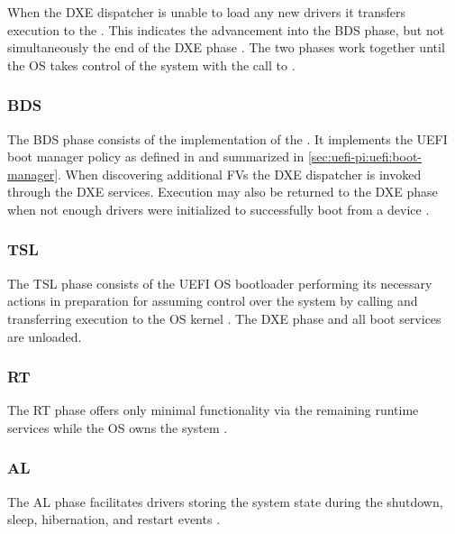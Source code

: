 When the \ac{DXE} dispatcher is unable to load any new drivers it transfers execution to the  \cite[Vol. 2, 2.4]{pi-spec}.
This indicates the advancement into the \ac{BDS} phase, but not simultaneously the end of the \ac{DXE} phase \cite[Vol. 2, 2.1]{pi-spec}.
The two phases work together until the \ac{OS} takes control of the system with the call to .

\subsubsection{\acf{BDS}}

The \ac{BDS} phase consists of the implementation of the .
It implements the \ac{UEFI} boot manager policy as defined in \cite[Section 3]{uefi-spec} and summarized in \autoref{sec:uefi-pi:uefi:boot-manager}.
When discovering additional \acp{FV} the \ac{DXE} dispatcher is invoked through the \ac{DXE} services.
Execution may also be returned to the \ac{DXE} phase when not enough drivers were initialized to successfully boot from a device \cite[Vol. 2, 12.2]{pi-spec}.


\subsubsection{\acf{TSL}}

The \ac{TSL} phase consists of the \ac{UEFI} \ac{OS} bootloader performing its necessary actions in preparation for assuming control over the system by calling  and transferring execution to the \ac{OS} kernel \cite[Section 2.3]{tianocore-edk2-build-spec}.
The \ac{DXE} phase and all boot services are unloaded.

\subsubsection{\acf{RT}}

The \ac{RT} phase offers only minimal functionality via the remaining runtime services while the \ac{OS} owns the system \cite[Section 2.3]{tianocore-edk2-build-spec}.

\subsubsection{\acf{AL}}

The \ac{AL} phase facilitates drivers storing the system state during the shutdown, sleep, hibernation, and restart events \cite[Section 2.3]{tianocore-edk2-build-spec}.
